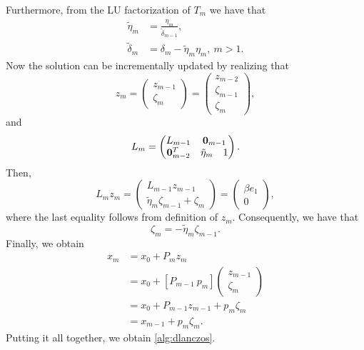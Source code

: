 Furthermore, from the LU factorization of $T_m$ we have that
\begin{align*}
  \tilde{\eta}_m   & = \frac{\eta_m}{\tilde{\delta}_{m-1}},       \\
  \tilde{\delta}_m & = \delta_m - \tilde{\eta}_m \eta_m, \ m > 1.
\end{align*}
Now the solution can be incrementally updated by realizing that
\[
  z_m =
  \begin{pmatrix}
    z_{m-1} \\
    \zeta_m
  \end{pmatrix} =
  \begin{pmatrix}
    z_{m-2}     \\
    \zeta_{m-1} \\
    \zeta_m
  \end{pmatrix},
\]
and
\[
  L_m =
  \begin{pmatrix}
    L_{m-1}            & \multicolumn{2}{c}{\mathbf{0}_{m-1}}     \\
    \mathbf{0}_{m-2}^T & \tilde{\eta}_m                       & 1
  \end{pmatrix}.
\]
Then,
\[
  L_m z_m =
  \begin{pmatrix}
    L_{m-1} z_{m-1} \\
    \tilde{\eta}_m \zeta_{m-1} + \zeta_m
  \end{pmatrix} =
  \begin{pmatrix}
    \beta e_1 \\
    0
  \end{pmatrix},
\]
where the last equality follows from definition of $z_m$. Consequently, we have that
\[
  \zeta_m = -\tilde{\eta}_m \zeta_{m-1}.
\]
Finally, we obtain
\begin{align*}
  x_m & = x_0 + P_m z_m                                   \\
      & = x_0 + \left[P_{m-1} \ p_m\right] \begin{pmatrix}
                                             z_{m-1} \\
                                             \zeta_m
                                           \end{pmatrix} \\
      & = x_0 + P_{m-1}z_{m-1} + p_m \zeta_m              \\
      & = x_{m-1} + p_m \zeta_m.
\end{align*}
Putting it all together, we obtain \cref{alg:dlanczos}.
